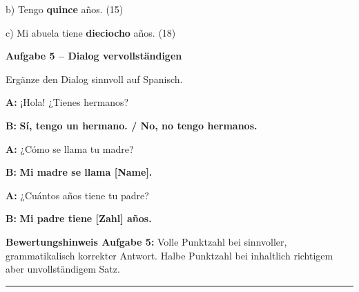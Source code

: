 \documentclass[11pt, a4paper]{article}
\newcommand{\fachfarbe}{spanisch}
\newcommand{\punktebox}[1]{\hfill\fbox{\small \_/#1}}
\newcommand{\lsg}[1]{\textcolor{loesung}{\textbf{#1}}}
\newenvironment{aufgabe}[1]{%
    \needspace{5\baselineskip}%
    \nopagebreak[4]%
    \vspace{10pt}
    \noindent\textbf{\textcolor{\fachfarbe}{Aufgabe #1}}
    \nopagebreak[4]%
    \vspace{5pt}
    \nopagebreak[4]%
    \begin{list}{}{\leftmargin=0pt}
    \item[]
}{%
    \end{list}
}
\begin{document}
\vspace{0.8em}

\noindent
b) Tengo \lsg{quince} años. \hfill (15)

\vspace{0.8em}

\noindent
c) Mi abuela tiene \lsg{dieciocho} años. \hfill (18)

\vspace{15pt}


\begin{aufgabe}{5 -- Dialog vervollständigen}
Ergänze den Dialog sinnvoll auf Spanisch. \punktebox{6}
\end{aufgabe}

\noindent
\textbf{A:} ¡Hola! ¿Tienes hermanos?

\vspace{0.8em}

\noindent
\textbf{B:} \lsg{Sí, tengo un hermano. / No, no tengo hermanos.}

\vspace{0.8em}

\noindent
\textbf{A:} ¿Cómo se llama tu madre?

\vspace{0.8em}

\noindent
\textbf{B:} \lsg{Mi madre se llama [Name].}

\vspace{0.8em}

\noindent
\textbf{A:} ¿Cuántos años tiene tu padre?

\vspace{0.8em}

\noindent
\textbf{B:} \lsg{Mi padre tiene [Zahl] años.}

\vspace{10pt}

\begin{infobox}
\textbf{Bewertungshinweis Aufgabe 5:} Volle Punktzahl bei sinnvoller, grammatikalisch korrekter Antwort. Halbe Punktzahl bei inhaltlich richtigem aber unvollständigem Satz.
\end{infobox}


\vspace{25pt}
\hrule
\vspace{10pt}
\end{document}
